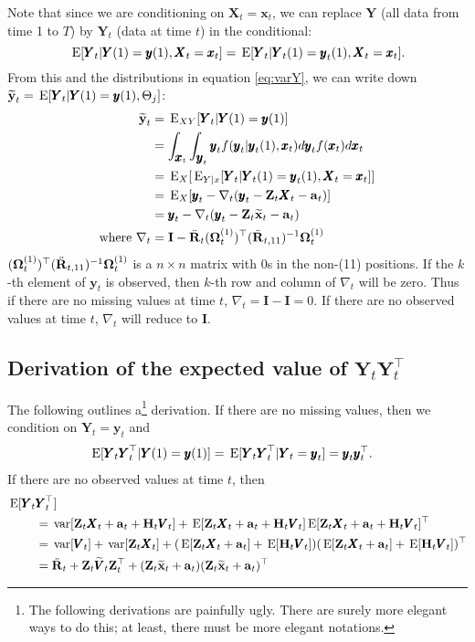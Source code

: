 \documentclass[]{article}
\def\OMG{\mbox{\boldmath $\Omega$}}
\def\ZZ{\mbox{$\mathbf Z$}}	\def\zz{\mbox{$\mathbf z$}}
\def\HH{\mbox{$\mathbf H$}}	\def\hh{\mbox{$\mathbf h$}}
\def\II{\mbox{$\mathbf I$}} \def\ii{\mbox{$\mathbf i$}}
\def\RR{\mbox{$\mathbf R$}}	 \def\rr{\mbox{$\mathbf r$}}
\def\VV{\mbox{$\pmb{V}$}}	\def\vv{\mbox{$\pmb{v}$}}
\def\XX{\mbox{$\pmb{X}$}}	\def\xx{\mbox{$\pmb{x}$}}
\def\YY{\mbox{$\pmb{Y}$}}	\def\yy{\mbox{$\pmb{y}$}}
\def\E{\,\textup{\textrm{E}}}
\def\var{\,\textup{\textrm{var}}}
\def\hatxt{\widetilde{\mbox{$\mathbf x$}}_t}
\def\hatyt{\widetilde{\mbox{$\mathbf y$}}_t}
\def\hatVt{\widetilde{\VV}_t}
\def\IR{\nabla}
\begin{document}
Note that since we are conditioning on $\XX_t=\xx_t$, we can replace $\YY$ (all data from time 1 to $T$) by $\YY_t$ (data at time $t$) in the conditional:
$$\E[\YY_t|\YY(1)=\yy(1),\XX_t=\xx_t]=\E[\YY_t|\YY_t(1)=\yy_t(1),\XX_t=\xx_t].$$
From this and the distributions in equation \ref{eq:varY}, we can write down $\hatyt=\E[\YY_t|\YY(1)=\yy(1),\Theta_j]$:
\begin{equation}
\begin{split}
\hatyt&=\E_{XY}[\YY_t|\YY(1)=\yy(1)]\\
&=\int_{\xx_t}\int_{\yy_t}\yy_t f(\yy_t|\yy_t(1),\xx_t)d\yy_t f(\xx_t)d\xx_t \\
&=\E_X[\E_{Y|x}[\YY_t|\YY_t(1)=\yy_t(1),\XX_t=\xx_t]]\\
&=\E_X[\yy_t-\IR_t(\yy_t-\ZZ_t\XX_t-\aa_t)]\\
&=\yy_t-\IR_t(\yy_t-\ZZ_t\hatxt-\aa_t)\\
\text{where }\IR_t &= \II-\ddot{\RR}_t(\OMG_t^{(1)})^\top(\ddot{\RR}_{t,11})^{-1}\OMG_t^{(1)}
\end{split}
\end{equation}
$(\OMG_t^{(1)})^\top(\ddot{\RR}_{t,11})^{-1}\OMG_t^{(1)}$ is a $n \times n$ matrix with 0s in the non-(11) positions. If the $k$-th element of $\yy_t$ is observed, then $k$-th row and column of $\IR_t$ will be zero.
Thus if there are no missing values at time $t$, $\IR_t=\II-\II=0$. If there are no observed values at time $t$, $\IR_t$ will reduce to $\II$. 

\subsection{Derivation of the expected value of $\YY_t\YY_t^\top$}
The following outlines a\footnote{The following derivations are painfully ugly.  There are surely more elegant ways to do this; at least, there must be more elegant notations.} derivation.  If there are no missing values, then we condition on $\YY_t=\yy_t$ and
\begin{equation}
\begin{split}
\E[\YY_t &\YY_t^\top|\YY(1)=\yy(1)] = \E[\YY_t \YY_t^\top|\YY_t=\yy_t] = \yy_t\yy_t^\top.
\end{split}
\end{equation}
If there are no observed values at time $t$, then 
\begin{equation}
\begin{split}
\E[\YY_t &\YY_t^\top]\\ 
&=\var[\ZZ_t\XX_t+\aa_t+\HH_t\VV_t]+\E[\ZZ_t\XX_t+\aa_t+\HH_t\VV_t]\E[\ZZ_t\XX_t+\aa_t+\HH_t\VV_t]^\top\\
&=\var[\VV_t]+\var[\ZZ_t\XX_t]+(\E[\ZZ_t\XX_t+\aa_t]+\E[\HH_t\VV_t])(\E[\ZZ_t\XX_t+\aa_t]+\E[\HH_t\VV_t])^\top\\
&=\ddot{\RR}_t+\ZZ_t\hatVt\ZZ_t^\top + (\ZZ_t\hatxt+\aa_t)(\ZZ_t\hatxt+\aa_t)^\top
\end{split}
\end{equation}
\end{document}
